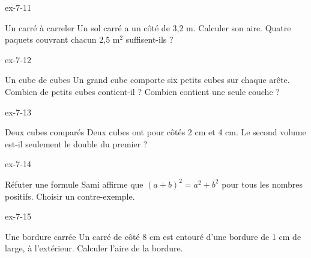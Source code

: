 \begin{blocLivre}{ex-7-11}\begin{exercice}[3]{Un carré à carreler}
Un sol carré a un côté de 3,2 m. Calculer son aire. Quatre paquets couvrant chacun 2,5 m$^2$ suffisent-ils ?
\label{fig-ex-7-11}
\end{exercice}\end{blocLivre}
\begin{blocLivre}{ex-7-12}\begin{exercice}[3]{Un cube de cubes}
Un grand cube comporte six petits cubes sur chaque arête. Combien de petits cubes contient-il ? Combien contient une seule couche ?
\label{fig-ex-7-12}
\end{exercice}\end{blocLivre}
\begin{blocLivre}{ex-7-13}\begin{exercice}[3]{Deux cubes comparés}
Deux cubes ont pour côtés 2 cm et 4 cm. Le second volume est-il seulement le double du premier ?
\label{fig-ex-7-13}
\end{exercice}\end{blocLivre}
\begin{blocLivre}{ex-7-14}\begin{exercice}[3]{Réfuter une formule}
Sami affirme que $(a+b)^2=a^2+b^2$ pour tous les nombres positifs. Choisir un contre-exemple.
\end{exercice}\end{blocLivre}
\begin{blocLivre}{ex-7-15}\begin{exercice}[3]{Une bordure carrée}
Un carré de côté 8 cm est entouré d’une bordure de 1 cm de large, à l’extérieur. Calculer l’aire de la bordure.
\label{fig-ex-7-15}
\end{exercice}\end{blocLivre}

\clearpage
